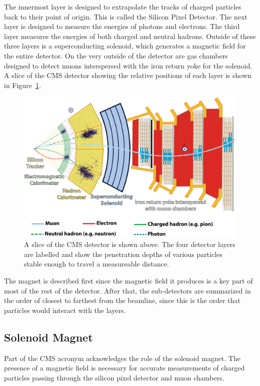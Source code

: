 The innermost layer is designed to extrapolate the tracks of charged particles
back to their point of origin.
This is called the Silicon Pixel Detector.
The next layer is designed to measure the energies of photons and electrons.
The third layer measures the energies of both charged and neutral hadrons.
Outside of these three layers is a superconducting solenoid,
which generates a magnetic field for the entire detector.
On the very outside of the detector are gas chambers designed to detect muons
interspersed with the iron return yoke for the solenoid.
A slice of the CMS detector showing the relative positions of each layer
is shown in Figure~\ref{fig:slice}.
\begin{figure}
  \centering
  \includegraphics[width=0.9\linewidth]{figures/CMSslice_whiteBackground.png}
  \caption[CMS detector slice]{
    A slice of the CMS detector is shown above\cite{Barney:2120661}.
    The four detector layers are labelled and show the penetration
    depths of various particles stable enough to travel a measureable distance.
    }
  \label{fig:slice}
\end{figure}

The magnet is described first since the magnetic field it produces is a key
part of most of the rest of the detector.
After that, the sub-detectors are summarized in the order of closest to farthest
from the beamline, since this is the order that particles would interact with the layers.

\subsection{Solenoid Magnet}

Part of the CMS acronym acknowledges the role of the solenoid magnet.
The presence of a magnetic field is necessary for accurate measurements
of charged particles passing through the silicon pixel detector and muon chambers.

